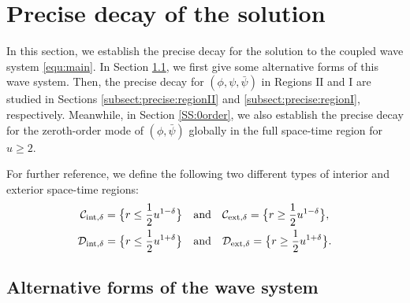 \documentclass[a4paper,reqno]{amsart}
\theoremstyle{definition}
\numberwithin{equation}{section}
\def\lab{\label}
\begin{document}
\section{Precise decay of the solution}\label{sec:precise-decay}

In this section, we establish the precise decay for the solution to the coupled wave system \eqref{equ:main}. In Section \ref{subsect:alternativeformsofwaveeqs}, we first give some alternative forms of this wave system. Then, the precise decay for $(\phi,\psi,\bar{\psi})$  in Regions $\mathrm{II}$ and $\mathrm{I}$ are studied in Sections \ref{subsect:precise:regionII} and \ref{subsect:precise:regionI}, respectively. Meanwhile, in Section \ref{SS:0order}, we also establish the precise decay for the zeroth-order mode of $(\phi, \bar{\psi})$ globally in the full space-time region for $u\geq 2$.

\smallskip
For further reference, we define the following two different types of interior and exterior space-time regions:
\begin{equation}
\lab{def:differentspacetimeregions}
\begin{aligned}
\mathcal{C}_{\rm{int},\delta}=\big\{r\le \frac{1}{2}u^{1-\delta}\big\}\quad &\mbox{and}\quad 
\mathcal{C}_{\rm{ext},\delta}=\big\{r\ge \frac{1}{2}u^{1-\delta}\big\},\\
\mathcal{D}_{\rm{int},\delta}=\big\{r\le \frac{1}{2}u^{1+\delta}\big\}\quad &\mbox{and}\quad 
\mathcal{D}_{\rm{ext},\delta}=\big\{r\ge \frac{1}{2}u^{1+\delta}\big\}.
\end{aligned}
\end{equation}


\subsection{Alternative forms of the wave system}
\lab{subsect:alternativeformsofwaveeqs}
\end{document}
